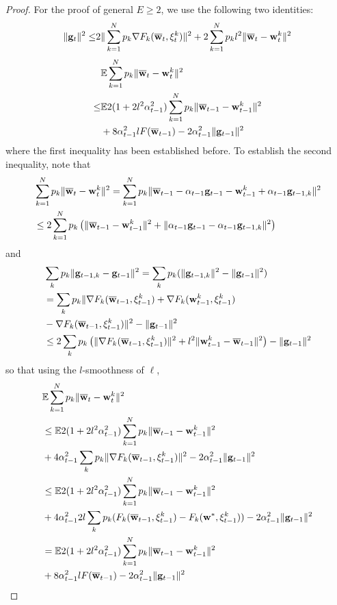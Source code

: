 \begin{proof}
	For the proof of general $E\ge2$, we use the following two identities:
	\begin{align*}
	\|{\mathbf{g}}_{t}\|^{2} \leq&2\|\sum_{k=1}^{N}p_{k}\nabla F_{k}({\overline{\mathbf{w}}}_{t},\xi_{t}^{k})\|^{2}+2\sum_{k=1}^{N}p_{k}l^{2}\|{\overline{\mathbf{w}}}_{t}-{\mathbf{w}}_{t}^{k}\|^{2}\\
	\end{align*}
	\begin{align*}
	&\mathbb{E}\sum_{k=1}^{N}p_{k}\|{\overline{\mathbf{w}}}_{t}-{\mathbf{w}}_{t}^{k}\|^{2}  \\
	\leq&\mathbb{E}2(1+2l^{2}\alpha_{t-1}^{2})\sum_{k=1}^{N}p_{k}\|{\overline{\mathbf{w}}}_{t-1}-{\mathbf{w}}_{t-1}^{k}\|^{2}\\
	&+8\alpha_{t-1}^{2}lF({\overline{\mathbf{w}}}_{t-1})-2\alpha_{t-1}^{2}\|{\mathbf{g}}_{t-1}\|^{2}
	\end{align*}
	where the first inequality has been established before. To establish
	the second inequality, note that 
	\begin{align*}
	&\sum_{k=1}^{N}p_{k}\|{\overline{\mathbf{w}}}_{t}-{\mathbf{w}}_{t}^{k}\|^{2}  =\sum_{k=1}^{N}p_{k}\|{\overline{\mathbf{w}}}_{t-1}-\alpha_{t-1}{\mathbf{g}}_{t-1}-{\mathbf{w}}_{t-1}^{k}+\alpha_{t-1}{\mathbf{g}}_{t-1,k}\|^{2}\\
	& \leq2\sum_{k=1}^{N}p_{k}\left(\|{\overline{\mathbf{w}}}_{t-1}-{\mathbf{w}}_{t-1}^{k}\|^{2}+\|\alpha_{t-1}{\mathbf{g}}_{t-1}-\alpha_{t-1}{\mathbf{g}}_{t-1,k}\|^{2}\right)
	\end{align*}
	and
	\begin{align*}
	& \sum_{k}p_{k}\|{\mathbf{g}}_{t-1,k}-{\mathbf{g}}_{t-1}\|^{2}=\sum_{k}p_{k}(\|{\mathbf{g}}_{t-1,k}\|^{2}-\|{\mathbf{g}}_{t-1}\|^{2})\\
	& =\sum_{k}p_{k}\|\nabla F_{k}({\overline{\mathbf{w}}}_{t-1},\xi_{t-1}^{k})+\nabla F_{k}({\mathbf{w}}_{t-1}^{k},\xi_{t-1}^{k})\\
	& -\nabla F_{k}({\overline{\mathbf{w}}}_{t-1},\xi_{t-1}^{k})\|^{2}-\|{\mathbf{g}}_{t-1}\|^{2}\\
	& \leq2\sum_{k}p_{k}\left(\|\nabla F_{k}({\overline{\mathbf{w}}}_{t-1},\xi_{t-1}^{k})\|^{2}+l^{2}\|{\mathbf{w}}_{t-1}^{k}-{\overline{\mathbf{w}}}_{t-1}\|^{2}\right)-\|{\mathbf{g}}_{t-1}\|^{2}
	\end{align*}
	so that using the $l$-smoothness of $\ell$, 
	\begin{align*}
	& \mathbb{E}\sum_{k=1}^{N}p_{k}\|{\overline{\mathbf{w}}}_{t}-{\mathbf{w}}_{t}^{k}\|^{2}\\
	& \leq\mathbb{E}2(1+2l^{2}\alpha_{t-1}^{2})\sum_{k=1}^{N}p_{k}\|{\overline{\mathbf{w}}}_{t-1}-{\mathbf{w}}_{t-1}^{k}\|^{2}\\ 
	&+4\alpha_{t-1}^{2}\sum_{k}p_{k}\|\nabla F_{k}({\overline{\mathbf{w}}}_{t-1},\xi_{t-1}^{k})\|^{2}-2\alpha_{t-1}^{2}\|{\mathbf{g}}_{t-1}\|^{2}\\
	& \leq\mathbb{E}2(1+2l^{2}\alpha_{t-1}^{2})\sum_{k=1}^{N}p_{k}\|{\overline{\mathbf{w}}}_{t-1}-{\mathbf{w}}_{t-1}^{k}\|^{2}\\
	& +4\alpha_{t-1}^{2}2l\sum_{k}p_{k}(F_{k}({\overline{\mathbf{w}}}_{t-1},\xi_{t-1}^{k})-F_{k}({\mathbf{w}}^{\ast},\xi_{t-1}^{k}))-2\alpha_{t-1}^{2}\|{\mathbf{g}}_{t-1}\|^{2}\\
	& =\mathbb{E}2(1+2l^{2}\alpha_{t-1}^{2})\sum_{k=1}^{N}p_{k}\|{\overline{\mathbf{w}}}_{t-1}-{\mathbf{w}}_{t-1}^{k}\|^{2}\\
	&+8\alpha_{t-1}^{2}lF({\overline{\mathbf{w}}}_{t-1})-2\alpha_{t-1}^{2}\|{\mathbf{g}}_{t-1}\|^{2}
	\end{align*}
	

\end{proof}
